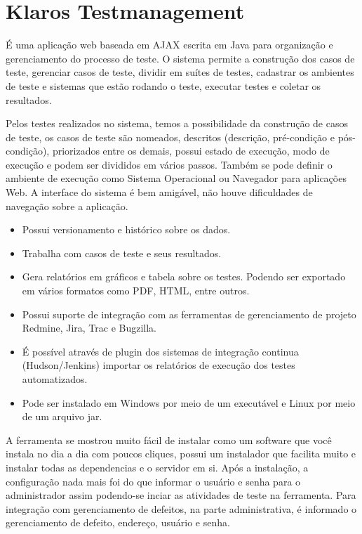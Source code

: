 \documentclass{abnt}
\begin{document}
		\section{Klaros Testmanagement}
		
			É uma aplicação web baseada em AJAX escrita em Java para organização e gerenciamento do processo de teste. O sistema
			permite a construção dos casos de teste, gerenciar casos de teste, dividir em suítes de testes, cadastrar os
			ambientes de teste e sistemas que estão rodando o teste, executar testes e coletar os resultados.
			
			Pelos testes realizados no sistema, temos a possibilidade da construção de casos de teste, os casos de teste são
			nomeados, descritos (descrição, pré-condição e pós-condição), priorizados entre os demais, possui estado de
			execução, modo de execução e podem ser divididos em vários passos. Também se pode definir o ambiente de execução
			como Sistema Operacional ou Navegador para aplicações Web. A interface do sistema é bem amigável, não houve
			dificuldades de navegação sobre a aplicação.
			
			\begin{itemize}
			  \item Possui versionamento e histórico sobre os dados.
			  \item Trabalha com casos de teste e seus resultados.
			  \item Gera relatórios em gráficos e tabela sobre os testes. Podendo ser exportado em vários formatos como PDF,
			  HTML, entre outros.
			  \item Possui suporte de integração com as ferramentas de gerenciamento de projeto Redmine, Jira, Trac e Bugzilla.
			  \item É possível através de plugin dos sistemas de integração continua (Hudson/Jenkins) importar os relatórios de
			  execução dos testes automatizados.
			  \item Pode ser instalado em Windows por meio de um executável e Linux por meio de um arquivo jar.
			\end{itemize}
			
			A ferramenta se mostrou muito fácil de instalar como um software que você instala no dia a dia com poucos cliques,
			possui um instalador que facilita muito e instalar todas as dependencias e o servidor em si. Após a instalação, a
			configuração nada mais foi do que informar o usuário e senha para o administrador assim podendo-se inciar as
			atividades de teste na ferramenta. Para integração com gerenciamento de defeitos, na parte administrativa, é
			informado o gerenciamento de defeito, endereço, usuário e senha. 
			
\end{document}
